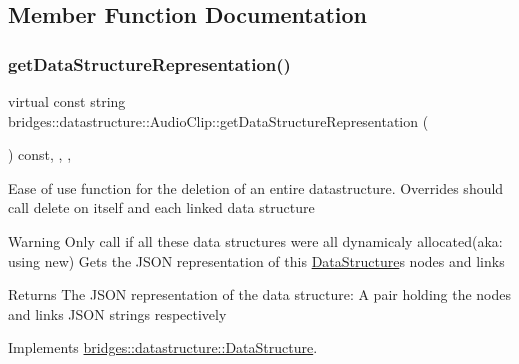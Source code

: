 \subsection{Member Function Documentation}
\mbox{\label{classbridges_1_1datastructure_1_1_audio_clip_a9ff485d7b2e0211d9e5c1432d47be617}} 
\subsubsection{\texorpdfstring{get\+Data\+Structure\+Representation()}{getDataStructureRepresentation()}}
{\footnotesize\ttfamily virtual const string bridges\+::datastructure\+::\+Audio\+Clip\+::get\+Data\+Structure\+Representation (\begin{DoxyParamCaption}{ }\end{DoxyParamCaption}) const\hspace{0.3cm}{\ttfamily [inline]}, {\ttfamily [final]}, {\ttfamily [override]}, {\ttfamily [virtual]}}

Ease of use function for the deletion of an entire datastructure. Overrides should call delete on itself and each linked data structure

\begin{DoxyWarning}{Warning}
Only call if all these data structures were all dynamicaly allocated(aka\+: using new) Gets the J\+S\+ON representation of this \hyperlink{classbridges_1_1datastructure_1_1_data_structure}{Data\+Structure}\textquotesingle{}s nodes and links
\end{DoxyWarning}
\begin{DoxyReturn}{Returns}
The J\+S\+ON representation of the data structure\+: A pair holding the nodes and links J\+S\+ON strings respectively 
\end{DoxyReturn}


Implements \hyperlink{classbridges_1_1datastructure_1_1_data_structure}{bridges\+::datastructure\+::\+Data\+Structure}.

\mbox{\label{classbridges_1_1datastructure_1_1_audio_clip_a1fc853180a8d825b2e5ea2d8e3f8e810}} 
